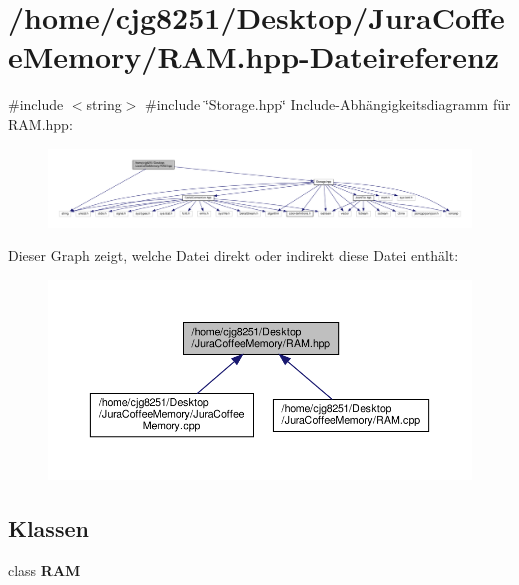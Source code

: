 \section{/home/cjg8251/\+Desktop/\+Jura\+Coffee\+Memory/\+R\+AM.hpp-\/\+Dateireferenz}
\label{_r_a_m_8hpp}
{\ttfamily \#include $<$string$>$}\newline
{\ttfamily \#include \char`\"{}Storage.\+hpp\char`\"{}}\newline
Include-\/\+Abhängigkeitsdiagramm für R\+A\+M.\+hpp\+:
\nopagebreak
\begin{figure}[H]
\begin{center}
\leavevmode
\includegraphics[width=350pt]{_r_a_m_8hpp__incl}
\end{center}
\end{figure}
Dieser Graph zeigt, welche Datei direkt oder indirekt diese Datei enthält\+:
\nopagebreak
\begin{figure}[H]
\begin{center}
\leavevmode
\includegraphics[width=350pt]{_r_a_m_8hpp__dep__incl}
\end{center}
\end{figure}
\subsection*{Klassen}
\begin{DoxyCompactItemize}
\item 
class \textbf{ R\+AM}
\end{DoxyCompactItemize}
